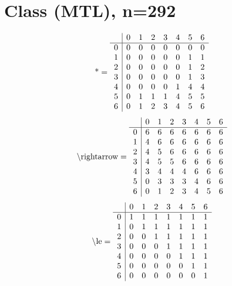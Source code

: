 \documentclass[11pt]{article}
\begin{document}
\section{Class (MTL), n=292}
\[\text{*} = 
\begin{array}{r | r r r r r r r}
 & 0 & 1 & 2 & 3 & 4 & 5 & 6 \\ \hline
0 & 0 & 0 & 0 & 0 & 0 & 0 & 0 \\
1 & 0 & 0 & 0 & 0 & 0 & 1 & 1 \\
2 & 0 & 0 & 0 & 0 & 0 & 1 & 2 \\
3 & 0 & 0 & 0 & 0 & 0 & 1 & 3 \\
4 & 0 & 0 & 0 & 0 & 1 & 4 & 4 \\
5 & 0 & 1 & 1 & 1 & 4 & 5 & 5 \\
6 & 0 & 1 & 2 & 3 & 4 & 5 & 6 \\
\end{array}
\]
\[\text{\textbackslash rightarrow} = 
\begin{array}{r | r r r r r r r}
 & 0 & 1 & 2 & 3 & 4 & 5 & 6 \\ \hline
0 & 6 & 6 & 6 & 6 & 6 & 6 & 6 \\
1 & 4 & 6 & 6 & 6 & 6 & 6 & 6 \\
2 & 4 & 5 & 6 & 6 & 6 & 6 & 6 \\
3 & 4 & 5 & 5 & 6 & 6 & 6 & 6 \\
4 & 3 & 4 & 4 & 4 & 6 & 6 & 6 \\
5 & 0 & 3 & 3 & 3 & 4 & 6 & 6 \\
6 & 0 & 1 & 2 & 3 & 4 & 5 & 6 \\
\end{array}
\]
\[\text{\textbackslash le} = 
\begin{array}{r | r r r r r r r}
 & 0 & 1 & 2 & 3 & 4 & 5 & 6 \\ \hline
0 & 1 & 1 & 1 & 1 & 1 & 1 & 1 \\
1 & 0 & 1 & 1 & 1 & 1 & 1 & 1 \\
2 & 0 & 0 & 1 & 1 & 1 & 1 & 1 \\
3 & 0 & 0 & 0 & 1 & 1 & 1 & 1 \\
4 & 0 & 0 & 0 & 0 & 1 & 1 & 1 \\
5 & 0 & 0 & 0 & 0 & 0 & 1 & 1 \\
6 & 0 & 0 & 0 & 0 & 0 & 0 & 1 \\
\end{array}
\]
\end{document}
